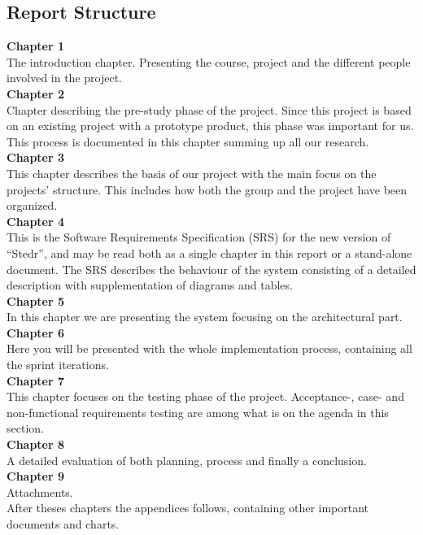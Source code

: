 \clearpage
\subsection{Report Structure}

\textbf{Chapter 1}\\
 The introduction chapter. Presenting the course, project and the different people involved in the project.\\[15pt]
\textbf{Chapter 2}\\
Chapter describing the pre-study phase of the project. Since this project is based on an existing project with a prototype product, this phase was important for us. This process is documented in this chapter summing up all our research. \\[15pt]
\textbf{Chapter 3}\\
This chapter describes the basis of our project with the main focus on the projects' structure. This includes how both the group and the project have been organized.\\[15pt]
\textbf{Chapter 4}\\
This is the Software Requirements Specification (SRS) for the new version of ``Stedr'', and may be read both as a single chapter in this report or a stand-alone document. The SRS describes the behaviour of the system consisting of a detailed description with supplementation of diagrams and tables.\\[15pt]
\textbf{Chapter 5}\\
In this chapter we are presenting the system focusing on the architectural part.\\[15pt]
\textbf{Chapter 6}\\
Here you will be presented with the whole implementation process, containing all the sprint iterations.\\[15pt]
\textbf{Chapter 7}\\
This chapter focuses on the testing phase of the project. Acceptance-, case- and non-functional requirements testing are among what is on the agenda in this section.\\[15pt]
\textbf{Chapter 8}\\
A detailed evaluation of both planning, process and finally a conclusion. \\[15pt]
\textbf{Chapter 9}\\
Attachments.\\[15pt]
After theses chapters the appendices follows, containing other important documents and charts.

